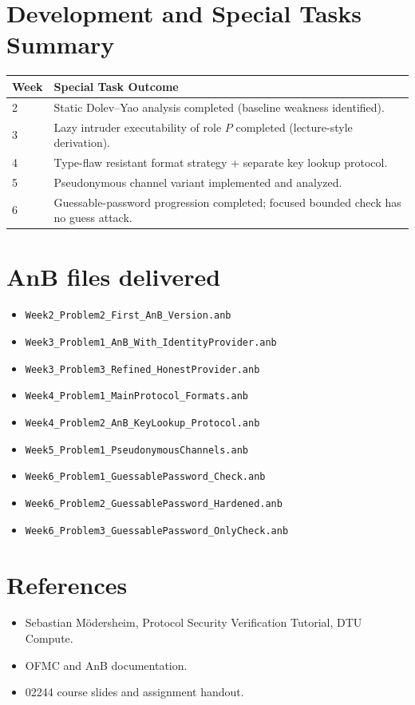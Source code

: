 \documentclass[11pt,a4paper]{article}
\begin{document}
\newpage
\section{Development and Special Tasks Summary}

\begin{center}
\begin{tabular}{ll}
\toprule
\textbf{Week} & \textbf{Special Task Outcome} \\
\midrule
2 & Static Dolev--Yao analysis completed (baseline weakness identified). \\
3 & Lazy intruder executability of role $P$ completed (lecture-style derivation). \\
4 & Type-flaw resistant format strategy + separate key lookup protocol. \\
5 & Pseudonymous channel variant implemented and analyzed. \\
6 & Guessable-password progression completed; focused bounded check has no guess attack. \\
\bottomrule
\end{tabular}
\end{center}

\section*{AnB files delivered}
\begin{itemize}
  \item \texttt{Week2\_Problem2\_First\_AnB\_Version.anb}
  \item \texttt{Week3\_Problem1\_AnB\_With\_IdentityProvider.anb}
  \item \texttt{Week3\_Problem3\_Refined\_HonestProvider.anb}
  \item \texttt{Week4\_Problem1\_MainProtocol\_Formats.anb}
  \item \texttt{Week4\_Problem2\_AnB\_KeyLookup\_Protocol.anb}
  \item \texttt{Week5\_Problem1\_PseudonymousChannels.anb}
  \item \texttt{Week6\_Problem1\_GuessablePassword\_Check.anb}
  \item \texttt{Week6\_Problem2\_GuessablePassword\_Hardened.anb}
  \item \texttt{Week6\_Problem3\_GuessablePassword\_OnlyCheck.anb}
\end{itemize}

\section*{References}
\begin{itemize}
  \item Sebastian M\"odersheim, Protocol Security Verification Tutorial, DTU Compute.
  \item OFMC and AnB documentation.
  \item 02244 course slides and assignment handout.
\end{itemize}
\end{document}
